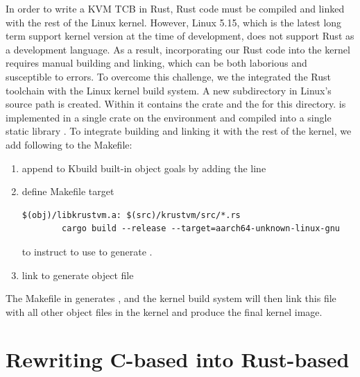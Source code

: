 In order to write a KVM TCB in Rust, Rust code must be compiled and linked with
the rest of the Linux kernel.
However, Linux 5.15, which is the latest long term support kernel version at
the time of \rustsec{} development, does not support Rust as a development
language. As a result, incorporating our Rust code into the kernel requires
manual building and linking, which can be both laborious and susceptible to
errors.
To overcome this challenge, we the integrated the Rust toolchain with the Linux
kernel build system. A new subdirectory in Linux's source path
 is created. Within it contains the \rustcore{} crate
and the  for this directory.
\rustcore{} is implemented in a single crate on the  environment
and compiled into a single static library .
To integrate building  and linking it with the
rest of the kernel, we add following to the Makefile:
\begin{enumerate}
\item{append  to Kbuild built-in object goals  by adding the line }
\item{define Makefile target
\begin{listing}[hbtp]
    \begin{verbatim}
$(obj)/libkrustvm.a: $(src)/krustvm/src/*.rs
        cargo build --release --target=aarch64-unknown-linux-gnu
    \end{verbatim}
    \label{lst:Makefile}
    \vspace{-1.2cm}
\end{listing}
to instruct  to use  to generate .
}
\item{link  to generate object file }
\end{enumerate}
The Makefile in  generates ,
and the kernel build system will then link this file with all other object
files in the kernel and produce the final kernel image.

\section{Rewriting C-based \secore{} into Rust-based \rustcore{}}

%

